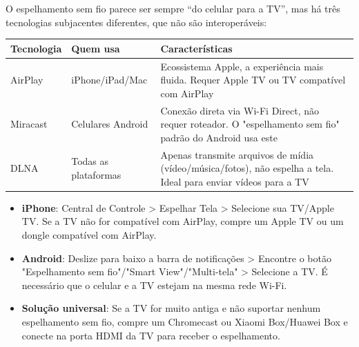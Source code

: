 


O espelhamento sem fio parece ser sempre “do celular para a TV”, mas há três tecnologias subjacentes diferentes, que não são interoperáveis:

\begin{center}
\begin{tabularx}{\linewidth}{|X|X|X|}
\hline
\textbf{Tecnologia} & \textbf{Quem usa} & \textbf{Características} \tabularnewline
\hline
AirPlay & iPhone/iPad/Mac & Ecossistema Apple, a experiência mais fluida. Requer Apple TV ou TV compatível com AirPlay \tabularnewline
Miracast & Celulares Android & Conexão direta via Wi-Fi Direct, não requer roteador. O "espelhamento sem fio" padrão do Android usa este \tabularnewline
DLNA & Todas as plataformas & Apenas transmite arquivos de mídia (vídeo/música/fotos), não espelha a tela. Ideal para enviar vídeos para a TV \tabularnewline
\hline
\end{tabularx}
\end{center}


\begin{itemize}
  \item \textbf{iPhone}: Central de Controle > Espelhar Tela > Selecione sua TV/Apple TV. Se a TV não for compatível com AirPlay, compre um Apple TV ou um dongle compatível com AirPlay.
  \item \textbf{Android}: Deslize para baixo a barra de notificações > Encontre o botão "Espelhamento sem fio"/"Smart View"/"Multi-tela" > Selecione a TV. É necessário que o celular e a TV estejam na mesma rede Wi-Fi.
  \item \textbf{Solução universal}: Se a TV for muito antiga e não suportar nenhum espelhamento sem fio, compre um Chromecast ou Xiaomi Box/Huawei Box e conecte na porta HDMI da TV para receber o espelhamento.
\end{itemize}

